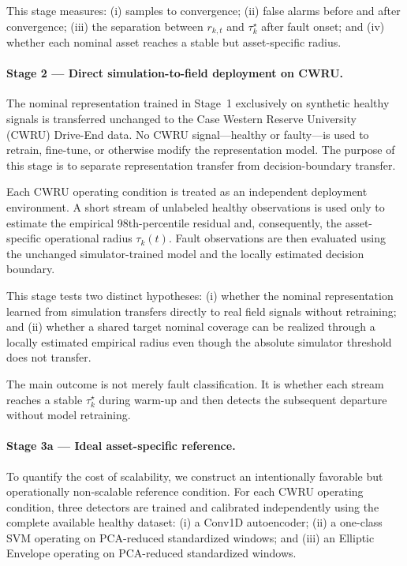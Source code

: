 \documentclass[11pt,a4paper]{article}
\begin{document}
This stage measures:
(i) samples to convergence;
(ii) false alarms before and after convergence;
(iii) the separation between $r_{k,t}$ and $\tau_k^\star$ after fault onset; and
(iv) whether each nominal asset reaches a stable but asset-specific radius.

\paragraph{Stage 2 --- Direct simulation-to-field deployment on CWRU.}
The nominal representation trained in Stage~1 exclusively on synthetic healthy signals is
transferred unchanged to the Case Western Reserve University (CWRU) Drive-End data. No CWRU
signal---healthy or faulty---is used to retrain, fine-tune, or otherwise modify the representation
model. The purpose of this stage is to separate representation transfer from decision-boundary
transfer.

Each CWRU operating condition is treated as an independent deployment environment. A short stream of unlabeled healthy observations is used only to estimate the empirical
98th-percentile residual and, consequently, the asset-specific operational radius
$\tau_k(t)$. Fault observations are then evaluated using the unchanged simulator-trained model
and the locally estimated decision boundary.

This stage tests two distinct hypotheses:
(i) whether the nominal representation learned from simulation transfers directly to real field
signals without retraining; and
(ii) whether a shared target nominal coverage can be realized through a locally estimated
empirical radius even though the absolute simulator threshold does not transfer.

The main outcome is not merely fault classification. It is whether each stream reaches a stable
$\tau_k^\star$ during warm-up and then detects the subsequent departure without model retraining.

\paragraph{Stage 3a --- Ideal asset-specific reference.}
To quantify the cost of scalability, we construct an intentionally favorable but operationally
non-scalable reference condition. For each CWRU operating condition, three detectors are trained
and calibrated independently using the complete available healthy dataset:
(i) a Conv1D autoencoder;
(ii) a one-class SVM operating on PCA-reduced standardized windows; and
(iii) an Elliptic Envelope operating on PCA-reduced standardized windows.
\end{document}

